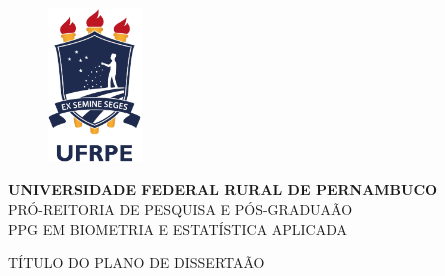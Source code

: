 \begin{titlepage}
\begin{figure}[t]
\centering
    \includegraphics[width=2.5cm]{figuras/ufrpe}\\
	\label{fig:pdsmodel}
\end{figure}


\begin{center}
\vspace{1.0truecm}
\large{\textbf{UNIVERSIDADE FEDERAL RURAL DE PERNAMBUCO}}\\
\large{PR\'{O}-REITORIA DE PESQUISA E P\'{O}S-GRADUA\~{A}O}\\
\large{PPG EM BIOMETRIA E ESTAT\'{I}STICA APLICADA}
\end{center}


\begin{center}
\vspace{5truecm}
\large{{T\'{I}TULO DO PLANO DE DISSERTA\~{A}O}}
\end{center}

\vspace{5.0truecm}

\begin{center}
\vspace{3truecm}
\end{center}

\end{titlepage}
\pagebreak
